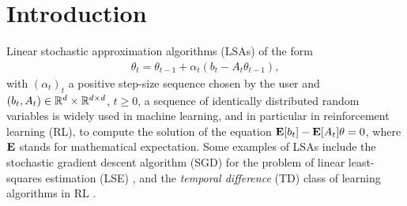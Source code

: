 \section{Introduction}\label{sec:intro}
Linear stochastic approximation algorithms (LSAs) 
of the form
\begin{align}\label{eq:lsaintro}
\theta_t=\theta_{t-1}+\alpha_t (b_t-A_t \theta_{t-1}),
\end{align}
with $(\alpha_t)_t$ a positive step-size sequence chosen by the user and 
$(b_t,A_t)\in \mathbb{R}^d\times \mathbb{R}^{d \times d}$,  $t\geq 0$, a sequence of identically distributed random variables is widely used in
machine learning, and in particular in reinforcement learning (RL), to compute the solution of the equation 
$\mathbf{E}[b_t] - \mathbf{E}[A_t] \theta = 0$, where $\mathbf{E}$ stands for mathematical expectation.
Some examples of LSAs include the stochastic gradient descent algorithm (SGD) for the problem of linear least-squares estimation  (LSE) \cite{bach,bachaistats}, and the \emph{temporal difference} (TD) class of learning algorithms in RL \cite{sutton,konda-tsitsiklis,KoTsi03:LSA,gtd,gtd2,gtdmp}.

